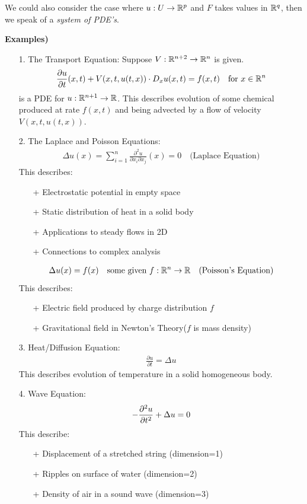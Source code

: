 \documentclass[12pt,a4paper]{report}
\begin{document}
We could also consider the case where $u:U \rightarrow \mathbb{R}^p$ and $F$ takes values in $\mathbb{R}^q$, then we speak of a \emph{system of PDE's}.
\s

\textbf{Examples)}
\begin{itemize}
\item[1.] The Transport Equation:
Suppose $V :\mathbb{R}^{n+2} \rightarrow \mathbb{R}^n$ is given.
\begin{align*}
\frac{\partial u}{\partial t}(x,t) + V(x,t,u(t,x)) \cdot D_x u (x,t) = f(x,t) \quad \text{for } x\in \mathbb{R}^n
\end{align*}
is a PDE for $u: \mathbb{R}^{n+1} \rightarrow \mathbb{R}$. This describes evolution of some chemical produced at rate $f(x,t)$ and being advected by a flow of velocity $V(x,t,u(t,x))$.

\item[2.] The Laplace and Poisson Equations:
\begin{align*}
\Delta u(x) = \sum_{i=1}^n \frac{\partial^2 u}{\partial x_i \partial x_j}(x)=0 \quad \text{(Laplace Equation)}
\end{align*}
This describes: \begin{itemize}
\item[+] Electrostatic potential in empty space
\item[+] Static distribution of heat in a solid body
\item[+] Applications to steady flows in 2D
\item[+] Connections to complex analysis
\end{itemize}

\begin{align*}
\Delta u(x) =f(x) \quad \text{some given } f: \mathbb{R}^n \rightarrow \mathbb{R} \quad \text{(Poisson's Equation)}
\end{align*}
This describes: \begin{itemize}
\item[+] Electric field produced by charge distribution $f$
\item[+] Gravitational field in Newton's Theory($f$ is mass density)
\end{itemize}

\item[3.] Heat/Diffusion Equation:
\begin{align*}
\frac{\partial u}{\partial t} = \Delta u
\end{align*}
This describes evolution of temperature in a solid homogeneous body.

\item[4.] Wave Equation:
\begin{align*}
-\frac{\partial^2 u}{\partial t^2} + \Delta u =0
\end{align*}
This describe: \begin{itemize}
\item[+] Displacement of a stretched string (dimension=1)
\item[+] Ripples on surface of water (dimension=2)
\item[+] Density of air in a sound wave (dimension=3)
\end{itemize}


\end{itemize}
\end{document}
